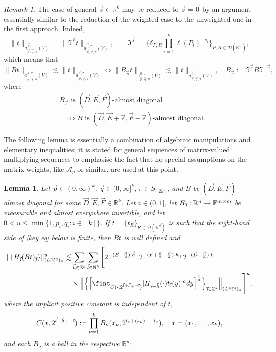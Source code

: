 \documentclass[11pt, reqno]{amsart}
\newtheorem{lemma}[theorem]{Lemma}
\theoremstyle{definition}
\theoremstyle{remark}
\newtheorem{remark}[theorem]{Remark}
\numberwithin{equation}{section}
\newcommand{\A}{\mathscr A}
\newcommand{\D}{\mathscr D}
\newcommand{\vD}{\vec D}
\newcommand{\vE}{\vec E}
\newcommand{\F}{\mathbb F}
\newcommand{\vF}{\vec F}
\newcommand{\N}{\mathbb N}
\newcommand{\R}{\mathbb R}
\newcommand{\Z}{\mathbb Z}
\newcommand{\vnull}{\vec 0}
\newcommand{\vh}{\vec h}
\newcommand{\vi}{\vec{\textit{\i}}}
\newcommand{\vj}{\vec{\textit{\j}}}
\newcommand{\vn}{\vec n}
\newcommand{\vl}{\vec l}
\newcommand{\vp}{\vec p}
\newcommand{\vq}{\vec q}
\newcommand{\vs}{\vec s}
\newcommand{\atau}{\dot a^{\vs,\tau}_{\vp,\vq,\pi}}
\newcommand{\antau}{\dot a^{\vnull,\tau}_{\vp,\vq,\pi}}
\newcommand{\lift}[1]{\mathfrak{I}^{#1}}
\newcommand{\abs}[1]{|#1|}
\newcommand{\Norm}[2]{\|#1\|_{#2}}
\newcommand{\BNorm}[2]{\Big\|#1\Big\|_{#2}}
\begin{document}
\begin{remark}\label{s vs 0}
The case of general $\vs\in\R^k$ may be reduced to $\vs=\vnull$ by an argument essentially similar to the reduction of the weighted case to the unweighted one in the first approach. Indeed,
\begin{equation*}
\Norm{t}{\atau(V)}=\Norm{\lift{\vs}t}{\antau(V)},\qquad
\lift{\vs}:=\Bigg\{\delta_{P,R}\prod_{i=1}^k\ell(P_i)^{-s_i}\Bigg\}_{P,R\in\D(\R^{\vn})},
\end{equation*}
which means that
\begin{equation*}
\Norm{Bt}{\atau(V)}\lesssim\Norm{t}{\atau(V)}
\Longleftrightarrow
\Norm{B_{\vs}t}{\antau(V)}\lesssim\Norm{t}{\antau(V)},\quad
B_{\vs}:=\lift{\vs}B\lift{-\vs},
\end{equation*}
where
\begin{align*}
&B_{\vs}\text{ is } (\vD,\vE,\vF)\text{-almost diagonal }  \\
&\quad\Longleftrightarrow
B\text{ is }(\vD,\vE+\vs,\vF-\vs)\text{-almost diagonal}.
\end{align*}
\end{remark}

The following lemma is essentially a combination of algebraic manipulations and elementary inequalities; it is stated for general sequences of matrix-valued multiplying sequences to emphasise the fact that no special assumptions on the matrix weights, like $\A_p$ or similar, are used at this point.

\begin{lemma}\label{key lem}
Let $\vp\in(0,\infty)^k$, $\vq\in(0,\infty]^k$, $\pi\in S_{[2k]}$, and $B$ be $(\vD,\vE,\vF)$-almost diagonal for some $\vD,\vE,\vF\in\R^k$.
Let $a\in(0,1]$, let $H_{\vj}:\R^n\to\F^{m\times m}$ be measurable and almost everywhere invertible, and let $0<u\leq\min\{1,p_i,q_i:i\in[k]\}$.
If $t=\{t_R\}_{R\in\D(\R^{\vn})}$ is such that the right-hand side of \eqref{key eq} below is finite, then
$Bt$ is well defined and
\begin{equation}\label{key eq}
\begin{split}
\Norm{\{H_{\vj}(Bt)_{\vj}\}}{(L^{\vp}\ell^{\vq})_\pi}^u
\lesssim &\sum_{\vh\in\Z^k}\sum_{\vl\in\N^k}
\Bigg[ 2^{-(\vE-\frac{\vn}{2})\cdot\vh_-}2^{-(\vF+\frac{\vn}{2}-\frac{\vn}{a})\cdot\vh_+}
2^{-(\vD-\frac{\vn}{a})\cdot\vl}
\phantom{\fint}\Big. \\
&\times \Big.\BNorm{
\Big\{\Big[\fint_{C(\cdot,2^{\vl+\vh_+-\vi})}\abs{H_{\vi-\vh}(\cdot)t_{\vi}(y)}^a dy\Big]^{\frac1a}\Big\}_{\vi\in\Z^k}
}{(L^{\vp}\ell^{\vq})_\pi}\Bigg]^u,
\end{split}
\end{equation}
where the implicit positive constant is independent of $t$,
\begin{equation*}
C(x,2^{\vl+\vh_+-\vi})
:=\prod_{\nu=1}^k B_\nu(x_{\nu},2^{l_{\nu}+(h_{\nu})_+-i_{\nu}}),\quad
x=(x_1,\ldots,x_k),
\end{equation*}
and each $B_\nu$ is a ball in the respective $\R^{n_{\nu}}$.
\end{lemma}
\end{document}
